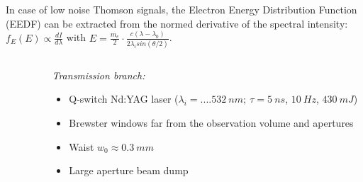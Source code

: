 \documentclass{beamer}
\begin{document}
\begin{frame}{}
\begin{tcbposter}
{	In case of low noise Thomson signals, the Electron Energy Distribution Function (EEDF) can be extracted from the normed derivative of the spectral intensity: $f_{E}(E) \propto \frac{dI}{d\lambda}$ with $E=\frac{m_{e}}{2} \cdot \frac{c (\lambda-\lambda_{0})}{2 \lambda_{i} sin(\theta/2)}$.
	

 } 
 
 
 \end{tcbposter}

\vspace{.02\paperwidth}    

\begin{columns}[t] 
	
	\begin{column}{.02\paperwidth}
	\end{column} 

	\begin{column}{.96\paperwidth}
     
       \begin{tcolorbox}[title= \color{beige} \faDotCircleO \ Experimental setup \faDotCircleO,  width=.96\paperwidth, arc=10mm, colback=bleuet, colframe=bleuet]%
     \vspace{.0075\paperwidth} 
     \small
     \color{beige}
     \begin{columns}
     		\begin{column}{.0075\paperwidth}
     		\end{column} 
     		     
     		\begin{column}{.4\paperwidth}
     		\textsl{Transmission branch:}
     		\begin{itemize}
     			\item Q-switch Nd:YAG laser ($\lambda_{i}=....532 \ nm; \ \tau=5 \ ns$, $10 \ Hz$, $430 \ mJ$)
     			\item Brewster windows far from the observation volume and apertures
     			\item Waist $w_{0}\approx 0.3 \ mm$
     			\item Large aperture beam dump
     		\end{itemize}
     		

\end{column}
\end{columns}
\end{tcolorbox}
\end{column}
\end{columns}
\end{frame}
\end{document}

